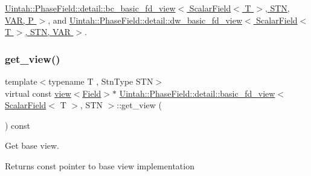 \hyperlink{classUintah_1_1PhaseField_1_1detail_1_1bc__basic__fd__view_3_01ScalarField_3_01T_01_4_00_01STN_00_01VAR_00_01P_01_4_a46e6a2a932a522c1ed93c7c28d728e83}{Uintah\+::\+Phase\+Field\+::detail\+::bc\+\_\+basic\+\_\+fd\+\_\+view$<$ Scalar\+Field$<$ T $>$, S\+T\+N, V\+A\+R, P $>$}, and \hyperlink{classUintah_1_1PhaseField_1_1detail_1_1dw__basic__fd__view_3_01ScalarField_3_01T_01_4_00_01STN_00_01VAR_01_4_ada3c79dde199711c630431fad25fbc2e}{Uintah\+::\+Phase\+Field\+::detail\+::dw\+\_\+basic\+\_\+fd\+\_\+view$<$ Scalar\+Field$<$ T $>$, S\+T\+N, V\+A\+R $>$}.

\mbox{\label{classUintah_1_1PhaseField_1_1detail_1_1basic__fd__view_3_01ScalarField_3_01T_01_4_00_01STN_01_4_a006d6f7c6fd81ff2c8d53f59656a23dc}} 
\subsubsection{\texorpdfstring{get\+\_\+view()}{get\_view()}\hspace{0.1cm}{\footnotesize\ttfamily [2/2]}}
{\footnotesize\ttfamily template$<$typename T , Stn\+Type S\+TN$>$ \\
virtual const \hyperlink{classUintah_1_1PhaseField_1_1detail_1_1view}{view}$<$\hyperlink{structUintah_1_1PhaseField_1_1ScalarField}{Field}$>$$\ast$ \hyperlink{classUintah_1_1PhaseField_1_1detail_1_1basic__fd__view}{Uintah\+::\+Phase\+Field\+::detail\+::basic\+\_\+fd\+\_\+view}$<$ \hyperlink{structUintah_1_1PhaseField_1_1ScalarField}{Scalar\+Field}$<$ T $>$, S\+TN $>$\+::get\+\_\+view (\begin{DoxyParamCaption}{ }\end{DoxyParamCaption}) const\hspace{0.3cm}{\ttfamily [pure virtual]}}



Get base view. 

\begin{DoxyReturn}{Returns}
const pointer to base view implementation 
\end{DoxyReturn}


